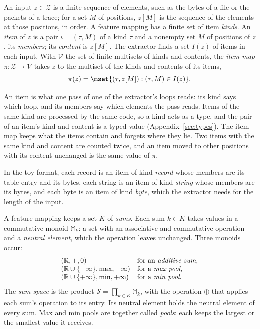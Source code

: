 \label{def:fw:item}
{
An input $z \in \mathcal{Z}$ is a finite sequence of elements, such as the bytes of a file or the packets of a trace;
for a set $M$ of positions, $z[M]$ is the sequence of the elements at those positions, in order. A feature mapping has
a finite set of item \emph{kinds}. An \emph{item} of $z$ is a pair $\iota = (\tau, M)$ of a kind $\tau$ and a nonempty
set $M$ of positions of $z$, its \emph{members}; its \emph{content} is $z[M]$. The extractor finds a set $I(z)$ of
items in each input. With $\mathcal{V}$ the set of finite multisets of kinds and contents, the \emph{item map}
$\pi: \mathcal{Z} \to \mathcal{V}$ takes $z$ to the multiset of the kinds and contents of its items,
\begin{equation}
  \label{eq:fw:items}
  \pi(z) = \mset{(\tau, z[M]) : (\tau, M) \in I(z)}.
\end{equation}
}

\noindent An item is what one pass of one of the extractor's loops reads: its kind says which loop, and its members
say which elements the pass reads. Items of the same kind are processed by the same code, so a kind acts as a type,
and the pair of an item's kind and content is a typed value (Appendix~\ref{sec:types}). The item map keeps what the
items contain and forgets where they lie. Two items with the same kind and content are counted twice, and an item
moved to other positions with its content unchanged is the same value of $\pi$.
\begin{runex}
In the toy format, each record is an item of kind \emph{record} whose members are its table entry and its bytes, each
string is an item of kind \emph{string} whose members are its bytes, and each byte is an item of kind \emph{byte}, which
the extractor needs for the length of the input.
\end{runex}

\label{def:fw:sums}
{
A feature mapping keeps a set $K$ of \emph{sums}. Each sum $k \in K$ takes values in a commutative monoid
$\mathbb{M}_k$: a set with an associative and commutative operation and a \emph{neutral element}, which the operation
leaves unchanged. Three monoids occur:
\begin{equation}
  \label{eq:fw:monoids}
  \begin{array}{@{}ll@{}}
    (\mathbb{R}, +, 0) & \text{for an \emph{additive sum},} \\
    (\mathbb{R} \cup \{-\infty\}, \max, -\infty) & \text{for a \emph{max pool},} \\
    (\mathbb{R} \cup \{+\infty\}, \min, +\infty) & \text{for a \emph{min pool}.}
  \end{array}
\end{equation}
The \emph{sum space} is the product $\mathcal{S} = \prod_{k \in K} \mathbb{M}_k$, with the operation $\oplus$ that
applies each sum's operation to its entry. Its neutral element holds the neutral element of every sum. Max and
min pools are together called \emph{pools}: each keeps the largest or the smallest value it receives.
}

